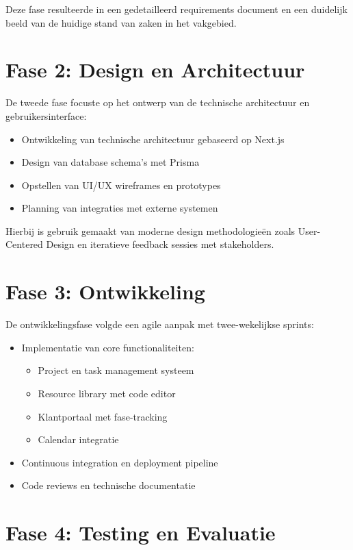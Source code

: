Deze fase resulteerde in een gedetailleerd requirements document en een duidelijk beeld van de huidige stand van zaken in het vakgebied.

\section{Fase 2: Design en Architectuur}
\label{sec:fase2}

De tweede fase focuste op het ontwerp van de technische architectuur en gebruikersinterface:

\begin{itemize}
    \item Ontwikkeling van technische architectuur gebaseerd op Next.js
    \item Design van database schema's met Prisma
    \item Opstellen van UI/UX wireframes en prototypes
    \item Planning van integraties met externe systemen
\end{itemize}

Hierbij is gebruik gemaakt van moderne design methodologieën zoals User-Centered Design en iteratieve feedback sessies met stakeholders.

\section{Fase 3: Ontwikkeling}
\label{sec:fase3}

De ontwikkelingsfase volgde een agile aanpak met twee-wekelijkse sprints:

\begin{itemize}
    \item Implementatie van core functionaliteiten:
    \begin{itemize}
        \item Project en task management systeem
        \item Resource library met code editor
        \item Klantportaal met fase-tracking
        \item Calendar integratie
    \end{itemize}
    \item Continuous integration en deployment pipeline
    \item Code reviews en technische documentatie
\end{itemize}

\section{Fase 4: Testing en Evaluatie}
\label{sec:fase4}

